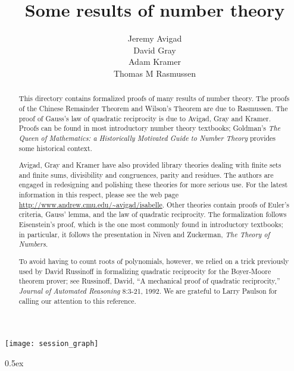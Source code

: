 \documentclass[11pt,a4paper]{article}
\begin{document}
\title{Some results of number theory}
\author{Jeremy Avigad\\
    David Gray\\
    Adam Kramer\\
    Thomas M Rasmussen}

\maketitle

\begin{abstract}
This directory contains formalized proofs of many results of number theory.
The proofs of the Chinese Remainder Theorem and Wilson's Theorem are due to
Rasmussen.  The proof of Gauss's law of quadratic reciprocity is due to
Avigad, Gray and Kramer.  Proofs can be found in most introductory number
theory textbooks; Goldman's \emph{The Queen of Mathematics: a Historically
Motivated Guide to Number Theory} provides some historical context.

Avigad, Gray and Kramer have also provided library theories dealing with
finite sets and finite sums, divisibility and congruences, parity and
residues.  The authors are engaged in redesigning and polishing these theories
for more serious use.  For the latest information in this respect, please see
the web page \url{http://www.andrew.cmu.edu/~avigad/isabelle}.  Other theories
contain proofs of Euler's criteria, Gauss' lemma, and the law of quadratic
reciprocity.  The formalization follows Eisenstein's proof, which is the one
most commonly found in introductory textbooks; in particular, it follows the
presentation in Niven and Zuckerman, \emph{The Theory of Numbers}.

To avoid having to count roots of polynomials, however, we relied on a trick
previously used by David Russinoff in formalizing quadratic reciprocity for
the Boyer-Moore theorem prover; see Russinoff, David, ``A mechanical proof
of quadratic reciprocity,'' \emph{Journal of Automated Reasoning} 8:3-21,
1992.  We are grateful to Larry Paulson for calling our attention to this
reference.
\end{abstract}

\tableofcontents

\begin{center}
  \texttt{[image: session\_graph]}  
\end{center}

\newpage

\parindent 0pt\parskip 0.5ex

\end{document}

